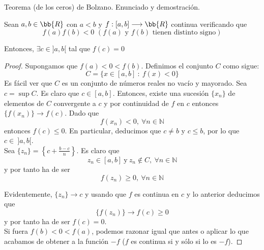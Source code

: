 \documentclass[12pt]{article}
\begin{document}
    \begin{ejercicio}[3 puntos]
        Teorema (de los ceros) de Bolzano. Enunciado y demostración.

        Sean $a,b\in \bb{R}$ con $a<b$ y $f:[a,b] \longrightarrow \bb{R}$ continua verificando que
        \[
            f(a)f(b)<0 \,\, (f(a) \text{ y } f(b) \text{ tienen distinto signo})
        \]

        Entonces, $\exists c \in ]a,b[$ tal que $f(c)=0$

        \begin{proof}
            Supongamos que $f(a) < 0 < f(b)$. Definimos el conjunto $C$ como sigue:
            \begin{equation*}
                C= \{x \in [a,b] ~:~ f(x) < 0\}
            \end{equation*}
            Es fácil ver que $C$ es un conjunto de números reales no vacío y mayorado. Sea $c = \sup C$.
            Es claro que $c \in [a,b]$. Entonces, existe una sucesión $\{x_n\}$ de elementos de $C$ convergente
            a $c$ y por continuidad de $f$ en $c$ entonces $\{f(x_n)\} \longrightarrow f(c)$. Dado que
            \begin{equation*}
                f(x_n) < 0, ~ \forall n \in \mathbb{N}
            \end{equation*}
            entonces $f(c) \leq 0$. En particular, deducimos que $c \neq b$ y $c \leq b$, por lo que $c \in ~ ]a,b[$.\\
            
            Sea $\{z_n\} = \left\{c + \frac{b-c}{n}\right\}$. Es claro que
            \begin{equation*}
                z_n \in [a,b] ~ \text{y} ~ z_n \notin C, ~ \forall n \in \mathbb{N}
            \end{equation*}
            y por tanto ha de ser
            \begin{equation*}
                f(z_n) \geq 0, ~ \forall n \in \mathbb{N}
            \end{equation*}
            
            Evidentemente, $\{z_n\} \longrightarrow c$ y usando que $f$ es continua en $c$ y lo anterior deducimos que
            \begin{equation*}
                \{f(z_n)\} \longrightarrow f(c) \geq 0
            \end{equation*}
            y por tanto ha de ser $f(c) = 0$.\\
            
            Si fuera $f(b) < 0 < f(a)$, podemos razonar igual que antes o aplicar lo que acabamos de obtener a la función $-f$
            ($f$ es continua si y sólo si lo es $-f$).
    \end{proof}
    \end{ejercicio}
    
\end{document}
